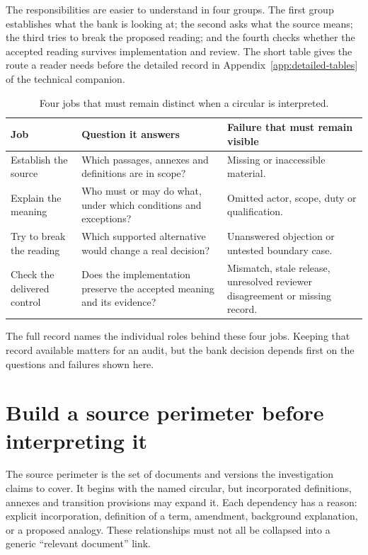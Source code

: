 The responsibilities are easier to understand in four groups. The first group
establishes what the bank is looking at; the second asks what the source means;
the third tries to break the proposed reading; and the fourth checks whether the
accepted reading survives implementation and review. The short table gives the
route a reader needs before the detailed record in Appendix~\ref{app:detailed-tables} of the technical companion.

\begin{table}[H]
\centering
\caption{Four jobs that must remain distinct when a circular is interpreted.}
\label{tab:ensemble-roles}
\begin{tabularx}{\textwidth}{P{35mm}YY}
\toprule
Job & Question it answers & Failure that must remain visible\\
\midrule
Establish the source & Which passages, annexes and definitions are in scope? & Missing or inaccessible material.\\
\addlinespace[0.5em]
Explain the meaning & Who must or may do what, under which conditions and exceptions? & Omitted actor, scope, duty or qualification.\\
\addlinespace[0.5em]
Try to break the reading & Which supported alternative would change a real decision? & Unanswered objection or untested boundary case.\\
\addlinespace[0.5em]
Check the delivered control & Does the implementation preserve the accepted meaning and its evidence? & Mismatch, stale release, unresolved reviewer disagreement or missing record.\\
\bottomrule
\end{tabularx}
\end{table}

The full record names the individual roles behind these four jobs. Keeping that
record available matters for an audit, but the bank decision depends first on the
questions and failures shown here.

\section{Build a source perimeter before interpreting it}
\label{merge:M06:03}


The source perimeter is the set of documents and versions the investigation
claims to cover. It begins with the named circular, but incorporated definitions,
annexes and transition provisions may expand it. Each dependency has a reason:
explicit incorporation, definition of a term, amendment, background explanation,
or a proposed analogy. These relationships must not all be collapsed into a
generic ``relevant document'' link.

